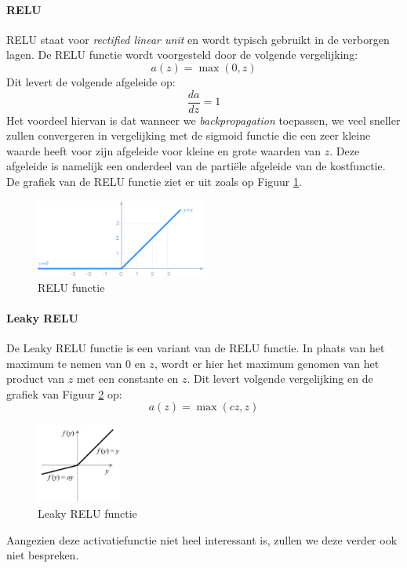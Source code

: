 \paragraph{RELU}

RELU staat voor \textit{rectified linear unit} en wordt typisch gebruikt in de verborgen lagen. De RELU functie wordt voorgesteld door de volgende vergelijking:
\begin{equation}
	a(z) = \max(0, z)
\end{equation}
\noindent
Dit levert de volgende afgeleide op:
\begin{equation}
	\frac{da}{dz} = 1
\end{equation}
\noindent
Het voordeel hiervan is dat wanneer we \textit{backpropagation} toepassen, we veel sneller zullen convergeren in vergelijking met de sigmoid functie die een zeer kleine waarde heeft voor zijn afgeleide voor kleine en grote waarden van $z$. Deze afgeleide is namelijk een onderdeel van de partiële afgeleide van de kostfunctie. \\
\newline
De grafiek van de RELU functie ziet er uit zoals op Figuur \ref{fig:relu}.
\begin{figure}[h]
	\centering
	\includegraphics[width=0.5\textwidth]{images/16-relu.png}
	\caption{RELU functie}
	\label{fig:relu}
\end{figure}
\newpage
\paragraph{Leaky RELU}

De Leaky RELU functie is een variant van de RELU functie. In plaats van het maximum te nemen van 0 en $z$, wordt er hier het maximum genomen van het product van $z$ met een constante en $z$. Dit levert volgende vergelijking en de grafiek van Figuur \ref{fig:leaky-relu} op:
\begin{equation}
	a(z) = \max(cz, z)
\end{equation}

\begin{figure}[h]
	\centering
	\includegraphics[width=0.25\textwidth]{images/17-leaky-relu.png}
	\caption{Leaky RELU functie}
	\label{fig:leaky-relu}
\end{figure}
\noindent
Aangezien deze activatiefunctie niet heel interessant is, zullen we deze verder ook niet bespreken.

